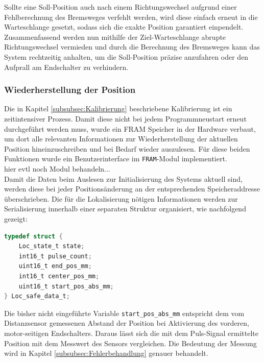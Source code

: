 \noindent
Sollte eine Soll-Position auch nach einem Richtungswechsel aufgrund einer Fehlberechnung des Bremsweges verfehlt werden, wird diese einfach erneut in die Warteschlange gesetzt, sodass sich die exakte Position garantiert einpendelt. Zusammenfassend werden nun mithilfe der Ziel-Warteschlange abrupte Richtungswechsel vermieden und durch die Berechnung des Bremsweges kann das System rechtzeitig anhalten, um die Soll-Position präzise anzufahren oder den Aufprall am Endschalter zu verhindern.
\subsubsection{Wiederherstellung der Position}
Die in Kapitel \ref{subsubsec:Kalibrierung} beschriebene Kalibrierung ist ein zeitintensiver Prozess. Damit diese nicht bei jedem Programmneustart erneut durchgeführt werden muss, wurde ein FRAM Speicher in der Hardware verbaut, um dort alle relevanten Informationen zur Wiederherstellung der aktuellen Position hineinzuschreiben und bei Bedarf wieder auszulesen. Für diese beiden Funktionen wurde ein Benutzerinterface im \verb|FRAM|-Modul implementiert.\\

\noindent
hier evtl noch Modul behandeln...\\

\noindent
Damit die Daten beim Auslesen zur Initialisierung des Systems aktuell sind, werden diese bei jeder Positionsänderung an der entsprechenden Speicheraddresse überschrieben. Die für die Lokalisierung nötigen Informationen werden zur Serialisierung innerhalb einer separaten Struktur organisiert, wie nachfolgend gezeigt:
\begin{lstlisting}[language=C, caption={Speicherformat der Positionsdaten}, label={lst:locSafeData}]
typedef struct {
	Loc_state_t state;
	int16_t pulse_count;
	uint16_t end_pos_mm;
	int16_t center_pos_mm;
	uint16_t start_pos_abs_mm;
} Loc_safe_data_t;
\end{lstlisting}
Die bisher nicht eingeführte Variable \verb|start_pos_abs_mm| entspricht dem vom Distanzsensor gemessenen Abstand der Position bei Aktivierung des vorderen, motor-seitigen Endschalters. Daraus lässt sich die mit dem Puls-Signal ermittelte Position mit dem Messwert des Sensors vergleichen. Die Bedeutung der Messung wird in Kapitel \ref{subsubsec:Fehlerbehandlung} genauer behandelt. \\

